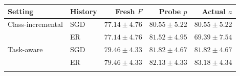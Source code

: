 \begin{tabular}{llrrr}
\toprule
Setting & History & Fresh $F$ & Probe $p$ & Actual $a$ \\
\midrule
Class-incremental & SGD & $77.14 \pm 4.76$ & $80.55 \pm 5.22$ & $80.55 \pm 5.22$ \\
 & ER & $77.14 \pm 4.76$ & $81.52 \pm 4.95$ & $69.39 \pm 7.54$ \\
\addlinespace
Task-aware & SGD & $79.46 \pm 4.33$ & $81.82 \pm 4.67$ & $81.82 \pm 4.67$ \\
 & ER & $79.46 \pm 4.33$ & $82.13 \pm 4.33$ & $83.18 \pm 4.34$ \\
\addlinespace
\bottomrule
\end{tabular}
